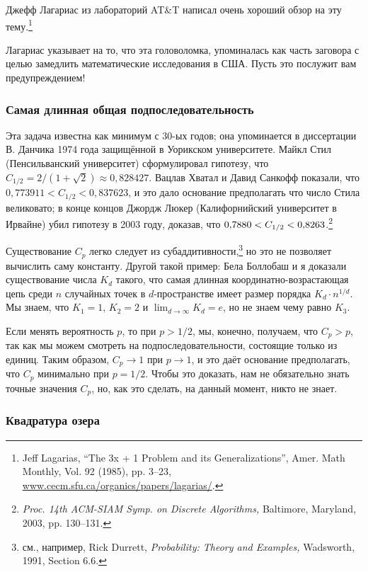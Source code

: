 Джефф Лагариас из лабораторий AT\&T написал очень хороший обзор на эту тему.\footnote{Jeff Lagarias, ``The 3x + 1 Problem and its Generalizations'', Amer. Math Monthly, Vol. 92 (1985), pp. 3--23, \href{http://www.cecm.sfu.ca/organics/papers/lagarias/}{www.cecm.sfu.ca/organics/papers/lagarias/}.}

Лагариас указывает на то, что эта головоломка, упоминалась как часть заговора с целью замедлить математические исследования в США.
Пусть это послужит вам предупреждением!

\subsubsection*{Самая длинная общая подпоследовательность}

Эта задача известна как минимум с 30-ых годов; она упоминается в диссертации В. Данчика 1974 года защищённой в Уорикском университете.
Майкл Стил (Пенсильванский университет) сформулировал гипотезу, что $C_{1/2} = 2/(1+\sqrt{2})\approx 0{,}828427$.
Вацлав Хватал и Давид Санкофф показали, что $0{,}773911 < C_{1/2} < 0{,}837623$, и это дало основание предполагать что число Стила великовато;
в конце концов Джордж Люкер (Калифорнийский университет в Ирвайне) убил гипотезу в 2003 году, доказав, что $0{,}7880 \z< C_{1/2} \z< 0{,}8263$.\footnote{\textit{Proc. 14th ACM-SIAM Symp. on Discrete Algorithms,} Baltimore, Maryland, 2003, pp. 130--131.}

Существование $C_p$ легко следует из субаддитивности,\footnote{см., например, Rick Durrett, \textit{Probability: Theory and Examples,} Wadsworth, 1991, Section 6.6.} но это не позволяет вычислить саму константу.
Другой такой пример: Бела Боллобаш и я доказали существование числа $K_d$ такого, что самая длинная координатно-возрастающая цепь среди $n$ случайных точек в $d$-пространстве имеет размер порядка $K_d\cdot n^{1/d}$.
Мы знаем, что $K_1=1$, $K_2=2$ и $\lim_{d\to\infty} K_d=e$, но не знаем чему равно $K_3$.

Если менять вероятность $p$, то при $p > 1/2$, мы, конечно, получаем, что $C_p>p$, так как мы можем смотреть на подпоследовательности, состоящие только из единиц.
Таким образом, $C_p\to 1$ при $p\to 1$, и это даёт основание предполагать, что $C_p$ минимально при $p=1/2$.
Чтобы это доказать, нам не обязательно знать точные значения $C_p$,
но, как это сделать, на данный момент, никто не знает. %

\subsubsection*{Квадратура озера}

